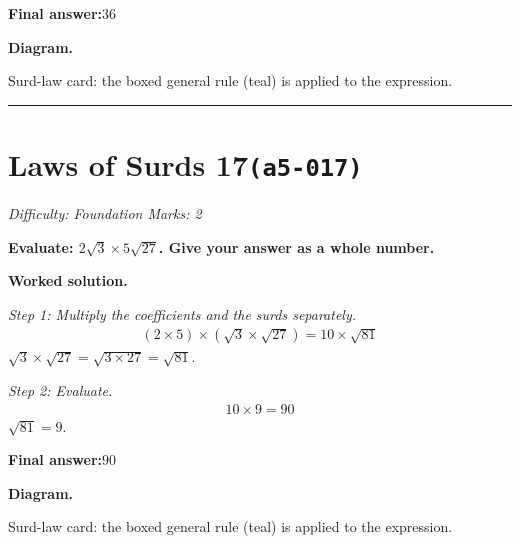 \documentclass[11pt]{article}
\newcommand{\question}[1]{\par\medskip\noindent\textbf{#1}\par}
\begin{document}
\begin{answerbox}
\textbf{Final answer:}\quad \(\displaystyle 36\)
\end{answerbox}
\textbf{Diagram.}

\begin{center}
\end{center}
\small Surd-law card: the boxed general rule (teal) is applied to the expression.\normalsize

\medskip\hrule

\section*{Laws of Surds 17\quad\small\texttt{(a5-017)}}
\textit{Difficulty: Foundation \quad\textbar\quad Marks: 2}

\question{Evaluate: \( 2\sqrt{3} \times 5\sqrt{27} \). Give your answer as a whole number.}

\textbf{Worked solution.}

\textit{Step 1: Multiply the coefficients and the surds separately.}
\[\begin{gathered}
(2 \times 5) \times (\sqrt{3} \times \sqrt{27}) = 10 \times \sqrt{81}
\end{gathered}\]
\( \sqrt{3} \times \sqrt{27} = \sqrt{3 \times 27} = \sqrt{81} \).

\textit{Step 2: Evaluate.}
\[\begin{gathered}
10 \times 9 = 90
\end{gathered}\]
\( \sqrt{81} = 9 \).

\begin{answerbox}
\textbf{Final answer:}\quad \(\displaystyle 90\)
\end{answerbox}
\textbf{Diagram.}

\begin{center}
\end{center}
\small Surd-law card: the boxed general rule (teal) is applied to the expression.\normalsize
\end{document}
